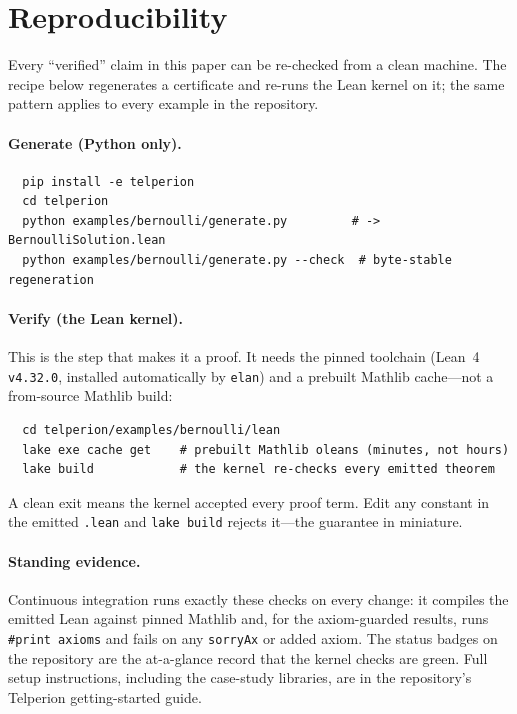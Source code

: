 \section{Reproducibility}
\label{sec:reproducibility}

Every ``verified'' claim in this paper can be re-checked from a clean machine. The
recipe below regenerates a certificate and re-runs the Lean kernel on it; the same
pattern applies to every example in the repository.

\paragraph{Generate (Python only).}
\begin{verbatim}
  pip install -e telperion
  cd telperion
  python examples/bernoulli/generate.py         # -> BernoulliSolution.lean
  python examples/bernoulli/generate.py --check  # byte-stable regeneration
\end{verbatim}

\paragraph{Verify (the Lean kernel).} This is the step that makes it a proof. It
needs the pinned toolchain (Lean~4 \texttt{v4.32.0}, installed automatically by
\texttt{elan}) and a prebuilt Mathlib cache---not a from-source Mathlib build:
\begin{verbatim}
  cd telperion/examples/bernoulli/lean
  lake exe cache get    # prebuilt Mathlib oleans (minutes, not hours)
  lake build            # the kernel re-checks every emitted theorem
\end{verbatim}
A clean exit means the kernel accepted every proof term. Edit any constant in the
emitted \texttt{.lean} and \texttt{lake build} rejects it---the guarantee in
miniature.

\paragraph{Standing evidence.} Continuous integration runs exactly these checks on
every change: it compiles the emitted Lean against pinned Mathlib and, for the
axiom-guarded results, runs \texttt{\#print axioms} and fails on any
\texttt{sorryAx} or added axiom. The status badges on the repository are the
at-a-glance record that the kernel checks are green. Full setup instructions,
including the case-study libraries, are in the repository's Telperion
getting-started guide.
